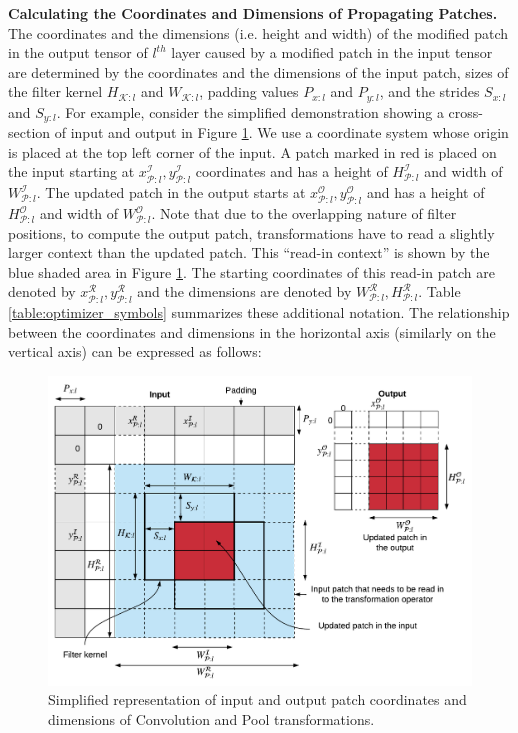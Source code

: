 \vspace{2mm}
\noindent \textbf{Calculating the Coordinates and Dimensions of Propagating Patches.} The coordinates and the dimensions (i.e. height and width) of the modified patch in the output tensor of $l^{th}$ layer caused by a modified patch in the input tensor are determined by the coordinates and the dimensions of the input patch, sizes of the filter kernel $H_{\mathcal{K}:l}$ and $W_{\mathcal{K}:l}$, padding values $P_{x:l}$ and $P_{y:l}$, and the strides $S_{x:l}$ and $S_{y:l}$.
For example, consider the simplified demonstration showing a cross-section of input and output in Figure \ref{fig:dimensions}.
We use a coordinate system whose origin is placed at the top left corner of the input.
A patch marked in red is placed on the input starting at $x^\mathcal{I}_{\mathcal{P}:l}, y^\mathcal{I}_{\mathcal{P}:l}$ coordinates and has a height of $H^\mathcal{I}_{\mathcal{P}:l}$ and width of $W^\mathcal{I}_{\mathcal{P}:l}$.
The updated patch in the output starts at $x^\mathcal{O}_{\mathcal{P}:l}, y^\mathcal{O}_{\mathcal{P}:l}$ and has a height of $H^\mathcal{O}_{\mathcal{P}:l}$ and width of $W^\mathcal{O}_{\mathcal{P}:l}$.
Note that due to the overlapping nature of filter positions, to compute the output patch, transformations have to read a slightly larger context than the updated patch.
This ``read-in context'' is shown by the blue shaded area in Figure \ref{fig:dimensions}.
The starting coordinates of this read-in patch are denoted by $x^\mathcal{R}_{\mathcal{P}:l}, y^\mathcal{R}_{\mathcal{P}:l}$ and the dimensions are denoted by $W^\mathcal{R}_{\mathcal{P}:l}, H^\mathcal{R}_{\mathcal{P}:l}$.
Table \ref{table:optimizer_symbols} summarizes these additional notation.
The relationship between the coordinates and dimensions in the horizontal axis (similarly on the vertical axis) can be expressed as follows:

\begin{figure}[t]
\includegraphics[width=\columnwidth]{images/dimensions}
\caption{Simplified representation of input and output patch coordinates and dimensions of Convolution and Pool transformations.}
\label{fig:dimensions}
\end{figure}

